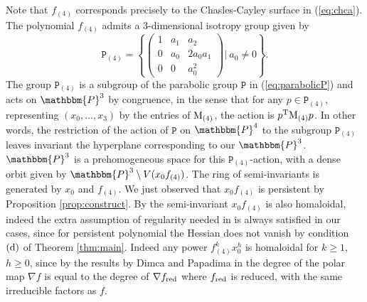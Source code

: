 \documentclass[aps,floatfix,groupedaddress,superscriptaddress,longbibliography,footinbib,notitlepage,showpacs]{revtex4-1}
\begin{document}
Note that $f_{(4)}$ corresponds precisely to the Chasles-Cayley surface in (\ref{eq:chca}). The polynomial $f_{(4)}$ admits a $3$-dimensional isotropy group given by
\begin{equation}\label{eq:P4}
\mathtt{P}_{(4)}=\left\{\begin{pmatrix}
1&a_1&a_2\\
0&a_0&2a_0a_1\\
0&0&a_0^2
\end{pmatrix} \Big|~a_0\neq 0\right\}.
\end{equation}
The group $\mathtt{P}_{(4)}$ is a subgroup of the parabolic group $\mathtt{P}$ in (\ref{eq:parabolicP}) and acts on $\mathbbm{P}^3$ by congruence, in the sense that
for any $p\in \mathtt{P}_{(4)}$, representing $(x_0,\ldots, x_3)$ by the entries of ${\rm M}_{(4)}$, the action is 
$p^{\rm T}{\rm M}_{(4)}p$. In other words, the restriction of the action of $\mathtt{P}$ on $\mathbbm{P}^4$ to the subgroup $\mathtt{P}_{(4)}$ leaves invariant the hyperplane corresponding to our $\mathbbm{P}^3$.
$\mathbbm{P}^3$ is a prehomogeneous space for this $\mathtt{P}_{(4)}$-action, with a dense orbit given by
$\mathbbm{P}^3\setminus V(x_0f_{(4)})$.
The ring of semi-invariants is generated by 
$x_0$ and $f_{(4)}$. We just observed that $x_0f_{(4)}$ is persistent
by Proposition \ref{prop:construct}. By \cite[Lemma 1]{Dol} the semi-invariant $x_0f_{(4)}$ is also homaloidal, indeed the extra assumption of regularity needed in \cite{Dol} is always satisfied in our cases, since for persistent polynomial the Hessian does not vanish by condition $(\textnormal{d})$ of Theorem \ref{thm:main}.
Indeed any power $f_{(4)}^kx_0^h$
is homaloidal for $k\geq 1$, $h\geq 0$, since by
the results by Dimca and Papadima in \cite{DP} the degree of the polar map $\nabla f$ is equal to the degree of $\nabla f_{\rm red}$ where $f_{\rm red}$ is reduced, with the same irreducible factors as $f$.
\end{document}
